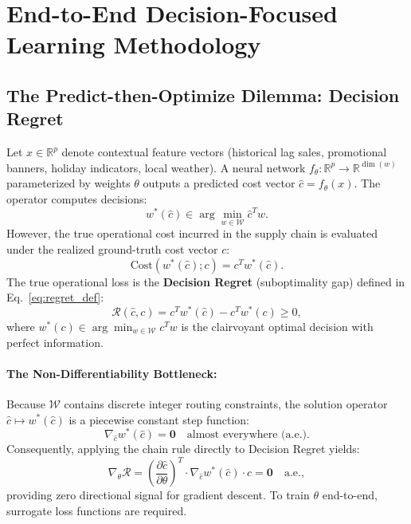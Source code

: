 \documentclass[11pt,a4paper]{article}
\theoremstyle{definition}
\theoremstyle{remark}
\begin{document}
\section{End-to-End Decision-Focused Learning Methodology}
\label{sec:methodology}

\subsection{The Predict-then-Optimize Dilemma: Decision Regret}
Let $x \in \mathbb{R}^p$ denote contextual feature vectors (historical lag sales, promotional banners, holiday indicators, local weather). A neural network $f_\theta: \mathbb{R}^p \to \mathbb{R}^{\dim(w)}$ parameterized by weights $\theta$ outputs a predicted cost vector $\hat{c} = f_\theta(x)$. The operator computes decisions:
    \begin{equation*}
        w^*(\hat{c}) \in \arg\min_{w \in \mathcal{W}} \hat{c}^T w.
    \end{equation*}
However, the true operational cost incurred in the supply chain is evaluated under the realized ground-truth cost vector $c$:
    \begin{equation*}
        \text{Cost}(w^*(\hat{c}); c) = c^T w^*(\hat{c}).
    \end{equation*}
The true operational loss is the \textbf{Decision Regret} (suboptimality gap) defined in Eq.~\eqref{eq:regret_def}:
\begin{equation}
    \mathcal{R}(\hat{c}, c) = c^T w^*(\hat{c}) - c^T w^*(c) \ge 0, \label{eq:regret_def}
\end{equation}
where $w^*(c) \in \arg\min_{w \in \mathcal{W}} c^T w$ is the clairvoyant optimal decision with perfect information.

\paragraph{The Non-Differentiability Bottleneck:}
Because $\mathcal{W}$ contains discrete integer routing constraints, the solution operator $\hat{c} \mapsto w^*(\hat{c})$ is a piecewise constant step function:
    \begin{equation*}
        \nabla_{\hat{c}} w^*(\hat{c}) = \mathbf{0} \quad \text{almost everywhere (a.e.)}.
    \end{equation*}
Consequently, applying the chain rule directly to Decision Regret yields:
    \begin{equation*}
        \nabla_\theta \mathcal{R} = \left( \frac{\partial \hat{c}}{\partial \theta} \right)^T \cdot \nabla_{\hat{c}} w^*(\hat{c}) \cdot c = \mathbf{0} \quad \text{a.e.},
    \end{equation*}
providing zero directional signal for gradient descent. To train $\theta$ end-to-end, surrogate loss functions are required.
\end{document}
